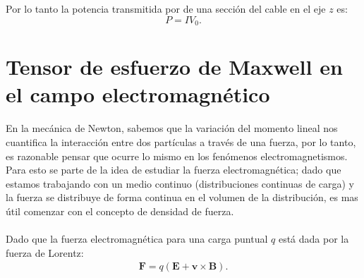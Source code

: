 \documentclass[11pt,fleqn]{book} %
\begin{document}
\begin{example}
Por lo tanto la potencia transmitida por de una secci\'on del cable en el eje $z$ es:
\begin{equation}
P=IV_{0}.
\end{equation}
\end{example}

\section{Tensor de esfuerzo de Maxwell en el campo electromagn\'etico}

En la mec\'anica de Newton, sabemos que la variaci\'on del momento lineal nos cuantifica la interacci\'on entre dos part\'iculas a trav\'es de una fuerza, por lo tanto, es razonable pensar que ocurre lo mismo en los fen\'omenos electromagnetismos.\\ Para esto se parte de la idea de estudiar la fuerza electromagn\'etica; dado que estamos trabajando con un medio continuo (distribuciones continuas de carga) y la fuerza se distribuye de forma continua en el volumen de la distribuci\'on, es mas \'util comenzar con el concepto de densidad de fuerza.\\\\
Dado que la fuerza electromagn\'etica para una carga puntual $q$ est\'a dada por la fuerza de Lorentz:
\begin{eqnarray*}
\textbf{F}=q(\textbf{E}+\textbf{v}\times\textbf{B}).
\end{eqnarray*}
\end{document}
